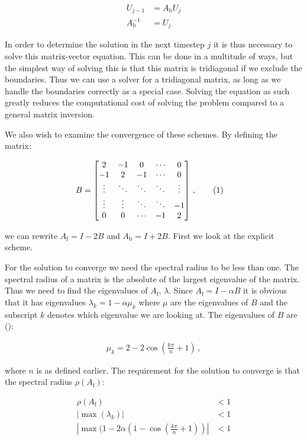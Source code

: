 \documentclass[reprint,english,notitlepage]{revtex4-1}  %
\newcommand\numberthis{\addtocounter{equation}{1}\tag{\theequation}}
\begin{document}
\begin{align*}
U_{j-1} &= A_\text{b} U_j \\
A_\text{b}^{-1} &= U_j
\end{align*}


In order to determine the solution in the next timestep $j$ it is thus necessary to solve this matrix-vector equation. This can be done in a multitude of ways, but the simplest way of solving this is that this matrix is tridiagonal if we exclude the boundaries. Thus we can use a solver for a tridiagonal matrix, as long as we handle the boundaries correctly as a special case. Solving the equation as such greatly reduces the computational cost of solving the problem compared to a general matrix inversion.

We also wish to examine the convergence of these schemes. By defining the matrix:

\begin{align*}
B &= \begin{bmatrix}
2 & -1 & 0 & \cdots & 0 \\
-1 & 2 & -1 &  \cdots & 0 \\
\vdots & \ddots & \ddots & \ddots & \vdots \\
\vdots & \vdots & \ddots & \ddots & -1 \\
0 & 0 & \cdots & -1 & 2 
\end{bmatrix} \, , \numberthis \label{eq:matrix_B}
\end{align*}

we can rewrite $A_\text{f} = I - 2B$ and $A_\text{b} = I + 2B$. First we look at the explicit scheme.

For the solution to converge we need the spectral radius to be less than one. The spectral radius of a matrix is the absolute of the largest eigenvalue of the matrix. Thus we need to find the eigenvalues of $A_\text{f}$, $\lambda$. Since $A_\text{f} = I - \alpha B$ it is obvious that it has eigenvalues $\lambda_{k} = 1 - \alpha \mu_k$ where $\mu$ are the eigenvalues of $B$ and the subscript $k$ denotes which eigenvalue we are looking at. The eigenvalues of $B$ are (\cite[p.~307]{Hjorth-Jensen2015}):

\begin{align*}
\mu_k = 2 - 2\cos(\frac{k\pi}{n} + 1) \, , 
\end{align*}

where $n$ is as defined earlier. The requirement for the solution to converge is that the spectral radius $\rho(A_\text{f})$:

\begin{align*}
\rho(A_\text{f}) &< 1 \\
|\max (\lambda_k) | &< 1 \\
|\max ( 1 - 2\alpha(1 - \cos (\frac{k\pi}{n} + 1) ) | &< 1
\end{align*}
\end{document}
